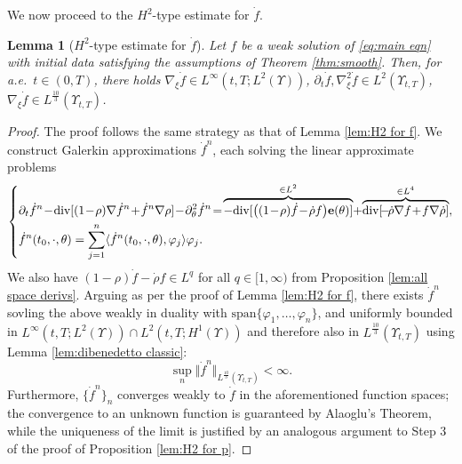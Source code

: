 \documentclass[11pt,a4paper,reqno]{amsart}
\newtheorem{lemma}[prop]{Lemma}
\theoremstyle{remark}
\theoremstyle{definition}
\numberwithin{equation}{section}
\DeclareMathOperator{\dv}{div}
\renewcommand{\span}{\mathrm{span}}
\newcommand{\e}{{\bf e}}
\newcommand{\bxi}{\xi}
\begin{document}
We now proceed to the $H^2$-type estimate for $\dot{f}$. 
\begin{lemma}[$H^2$-type estimate for $\dot{f}$]\label{lem:H2 dot f}
   Let $f$ be a weak solution of \eqref{eq:main eqn} with initial data satisfying the assumptions of Theorem \ref{thm:smooth}. Then, for a.e.~$t \in (0,T)$, there holds $\nabla_{\bxi} \dot{f} \in L^\infty(t,T;L^2(\Upsilon))$, $\partial_t \dot{f} , \nabla_{\bxi}^2 \dot{f} \in L^2(\Upsilon_{t,T})$, $\nabla_{\bxi} \dot{f} \in L^{\frac{10}{3}}(\Upsilon_{t,T})$. 
   \end{lemma}
\begin{proof}
The proof follows the same strategy as that of Lemma \ref{lem:H2 for f}. We construct Galerkin approximations $\dot{f}^n$, each solving the linear approximate problems 
\begin{equation*}
   \left\lbrace \begin{aligned}
        &\partial_t \dot{f}^n \!-\! \dv[(1\!-\!\rho)\nabla \dot{f}^n \!+\! \dot{f}^n \nabla \rho] \!-\! \partial^2_\theta \dot{f}^n \! = 
        \! \overbrace{-\!\dv[\big((1\!-\!\rho)\dot{f} \!-\! \dot{\rho} f \big)\e(\theta) ]}^{\in L^2} \!+\! \overbrace{\dv [  \!-\! \dot{\rho} \nabla f \!+\! f \nabla\dot{\rho}  ]}^{\in L^4}, 
        \\ &\dot{f}^n(t_0,\cdot,\theta) = \sum_{j=1}^n \langle \dot{f}^n(t_0,\cdot,\theta) , \varphi_j \rangle \varphi_j. 
    \end{aligned}\right. 
\end{equation*}
We also have $(1\!-\!\rho)\dot{f} \!-\! \dot{\rho} f \in L^q$ for all $q\in[1,\infty)$ from Proposition \ref{lem:all space derivs}. Arguing as per the proof of Lemma \ref{lem:H2 for f}, there exists $\dot{f}^n$ sovling the above weakly in duality with $\span\{\varphi_1,\dots,\varphi_n\}$, and uniformly bounded in $L^\infty(t,T;L^2(\Upsilon)) \cap L^2(t,T;H^1(\Upsilon))$ and therefore also in $L^{\frac{10}{3}}(\Upsilon_{t,T})$ using Lemma \ref{lem:dibenedetto classic}: 
\begin{equation}\label{eq: dot fn galerkin in L10 3}
    \sup_n \Vert \dot{f}^n \Vert_{L^{\frac{10}{3}}(\Upsilon_{t,T})} < \infty. 
\end{equation} 
Furthermore, $\{\dot{f}^n\}_n$ converges weakly to $\dot{f}$ in the aforementioned function spaces; the convergence to an unknown function is guaranteed by Alaoglu's Theorem, while the uniqueness of the limit is justified by an analogous argument to Step 3 of the proof of Proposition \ref{lem:H2 for p}. 


\end{proof}
\end{document}
